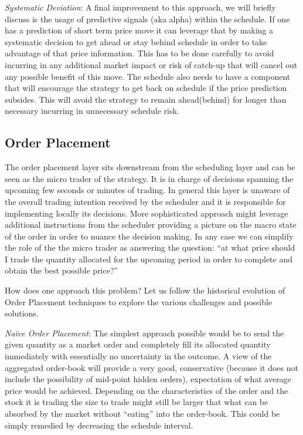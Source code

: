 \noindent\emph{Systematic Deviation}: A final improvement to this approach, we will briefly discuss is the usage of predictive signals (aka alpha) within the schedule. If one has a prediction of short term price move it can leverage that by making a systematic decision to get ahead or stay behind schedule in order to take advantage of that price information. This has to be done carefully to avoid incurring in any additional market impact or risk of catch-up that will cancel out any possible benefit of this move. The schedule also needs to have a component that will encourage the strategy to get back on schedule if the price prediction subsides. This will avoid the strategy to remain ahead(behind) for longer than necessary incurring in unnecessary schedule risk.



\subsection{Order Placement}

The order placement layer sits downstream from the scheduling layer and can be seen as the micro trader of the strategy. It is in charge of decisions spanning the upcoming few seconds or minutes of trading. In general this layer is unaware of the overall trading intention received by the scheduler and it is responsible for implementing locally its decisions. More sophisticated approach might leverage  additional instructions from the scheduler providing a picture on the macro state of the order in  order to nuance the decision making. In any case we can simplify the role of the the micro trader as answering the question: ``at what price should I trade the quantity allocated for the upcoming period in order to complete and obtain the best possible price?'' 


How does one approach this problem? Let us follow the historical evolution of Order Placement techniques to explore the various challenges and possible solutions. \twomedskip


\noindent\emph{Na\"ive Order Placement}: The simplest approach possible would be to send the given quantity as a market order and completely fill its allocated quantity immediately with essentially no uncertainty in the outcome. A view of the aggregated order-book will provide a very good, conservative (because it does not include the possibility of mid-point hidden orders), expectation of what average price would be achieved. Depending  on the characteristics of the order and the stock it is trading the size to trade might still be larger that what can be absorbed by the market without ``eating'' into the order-book. This could be simply remedied by decreasing the schedule interval.


